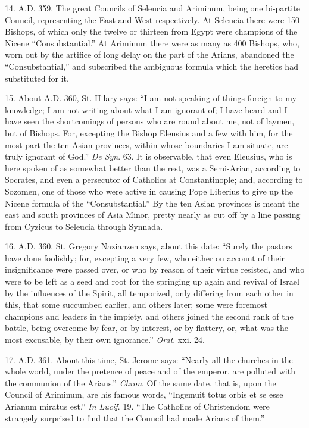 14. A.D. 359. The great Councils of Seleucia
and Ariminum, being one bi-partite Council, representing the East and
West respectively. At Seleucia there were 150 Bishops, of which only
the twelve or thirteen from Egypt were champions of the Nicene
``Consubstantial.'' At Ariminum there were as many as 400
Bishops, who, worn out by the artifice of long delay on the part of
the Arians, abandoned the ``Consubstantial,'' and subscribed
the ambiguous formula which the heretics had substituted for it.

15. About A.D. 360, St. Hilary says: ``I
am not speaking of things foreign to my knowledge; I am not writing
about what I am ignorant of; I have heard and I have seen the
shortcomings of persons who are round about me, not of laymen, but of
Bishops. For, excepting the Bishop Eleusius and a few with him, for
the most part the ten Asian provinces, within whose boundaries I am
situate, are truly ignorant of God.'' \emph{De Syn}. 63. It is
observable, that even Eleusius, who is here spoken of as somewhat
better than the rest, was a Semi-Arian, according to Socrates, and
even a persecutor of Catholics at Constantinople; and, according to
Sozomen, one of those who were active in causing Pope Liberius to give
up the Nicene formula of the ``Consubstantial.'' By the ten
Asian provinces is meant the east and south provinces of Asia Minor,
pretty nearly as cut off by a line passing from Cyzicus to Seleucia
through Synnada.

16. A.D. 360. St. Gregory Nazianzen says,
about this date: ``Surely the pastors have done foolishly; for,
excepting a very few, who either on account of their insignificance
were passed over, or who by reason of their virtue resisted, and who
were to be left as a seed and root for the springing up again
and revival of Israel by the influences of the Spirit, all temporized,
only differing from each other in this, that some succumbed earlier,
and others later; some were foremost champions and leaders in the
impiety, and others joined the second rank of the battle, being
overcome by fear, or by interest, or by flattery, or, what was the
most excusable, by their own ignorance.'' \emph{Orat}. xxi. 24.

17. A.D. 361. About this time, St. Jerome
says: ``Nearly all the churches in the whole world, under the
pretence of peace and of the emperor, are polluted with the communion
of the Arians.'' \emph{Chron}. Of the same date, that is, upon the
Council of Ariminum, are his famous words, ``Ingemuit totus orbis
et se esse Arianum miratus est.'' \emph{In Lucif}. 19. ``The
Catholics of Christendom were strangely surprised to find that the
Council had made Arians of them.''

